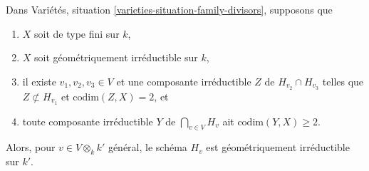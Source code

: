 \begin{lemma}
\label{lemma-bertini-irreducible}
\begin{reference}
\cite[théorème 6.3, partie 4)]{Jou}
\end{reference}
Dans Variétés, situation \ref{varieties-situation-family-divisors}, supposons que
\begin{enumerate}
\item $X$ soit de type fini sur $k$,
\item $X$ soit géométriquement irréductible sur $k$,
\item il existe $v_1, v_2, v_3 \in V$ et une composante irréductible
$Z$ de $H_{v_2} \cap H_{v_3}$ telles que $Z \not \subset H_{v_1}$ et
$\text{codim}(Z, X) = 2$, et
\item toute composante irréductible $Y$ de $\bigcap_{v \in V} H_v$
ait $\text{codim}(Y, X) \geq 2$.
\end{enumerate}
Alors, pour $v \in V \otimes_k k'$ général,
le schéma $H_v$ est géométriquement irréductible sur $k'$.
\end{lemma}

